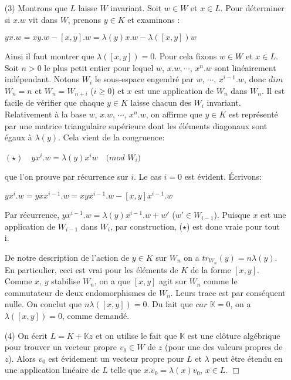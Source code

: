\documentclass[a4paper,openany,12pt]{report}
\newcommand{\KK}{\mathbb{K}}
\theoremstyle{break}
{\theorembodyfont{\upshape}
\newtheorem*{rmq}{Remarque :}
\newtheorem*{prv}{Preuve :}
\newtheorem*{ex}{Exemples :}
\newtheorem*{exe}{Exemple : }
\newtheorem*{nota}{Notation :}
\newtheorem*{dem}{D\'emonstration :}}
\begin{document}
\begin{dem}
\begin{itemize}
\item[(3)] Montrons que $L$ laisse $W$ invariant. Soit $w \in W$ et $x \in L$. Pour déterminer si $x.w$ vit dans $W$, prenons $y \in K$ et examinons :
\begin{center}
$yx.w=xy.w-[x,y].w= \lambda(y)x.w- \lambda([x,y])w $
\end{center}
Ainsi il faut montrer que $\lambda([x,y])=0$. Pour cela fixons $w \in W$ et $x \in L$. Soit $n>0$ le plus petit entier pour lequel $w$, $x.w, \cdots$, $x^{n}.w$ sont linéairement indépendant. Notons $W_{i}$ le sous-espace engendré par $w$, $\cdots$, $x^{i-1}.w$, donc $dim$ $W_{n}=n$ et $W_{n}=W_{n+i}$ ($i\geq 0$) et $x$ est une application de $W_{n}$ dans $W_{n}$. Il est facile de vérifier que chaque $y \in K$ laisse chacun des $W_{i}$ invariant. Relativement à la base $w$, $x.w$, $\cdots$, $x^{n}.w$, on affirme que $y \in K$ est représenté par une matrice triangulaire supérieure dont les éléments diagonaux sont égaux à $\lambda(y)$. Cela vient de la congruence:
\begin{center}
$(\star) \quad yx^{i}.w = \lambda(y)x^{i}w \quad (mod$ $W_{i})$
\end{center}
que l'on prouve par récurrence sur $i$. Le cas $i=0$ est évident. Écrivons: 
\begin{center}
$yx^{i}.w = yxx^{i-1}.w = xyx^{i-1}.w -[x,y]x^{i-1}.w $
\end{center}
Par récurrence, $yx^{i-1}.w = \lambda(y)x^{i-1}.w+w'$ ($w' \in W_{i-1}$). Puisque $x$ est une application de $W_{i-1}$ dans $W_{i}$, par construction, ($\star$) est donc vraie pour tout i.

De notre description de l'action de $y \in K$ sur $W_{n}$ on a $tr_{W_{n}}(y)=n \lambda(y)$. En particulier, ceci est vrai pour les éléments de $K$ de la forme $[x,y]$. Comme $x$, $y$ stabilise $W_{n}$, on a que $[x,y]$ agit sur $W_{n}$ comme le commutateur de deux endomorphismes de $W_{n}$. Leurs trace est par conséquent nulle. On conclut que $n \lambda([x,y]) = 0$. Du fait que $car$ $\KK=0$, on a $\lambda([x,y])=0$, comme demandé.

\item[(4)] On écrit $L=K+ \KK z$ et on utilise le fait que $\KK$ est une clôture algébrique pour trouver un vecteur propre $v_{0} \in W$ de $z$ (pour une des valeurs propres de $z$). Alors $v_{0}$ est évidement un vecteur propre pour $L$ et $\lambda$ peut être étendu en une application linéaire de $L$ telle que $x.v_{0} = \lambda(x)v_{0}$, $x \in L$. $\Box$
\end{itemize}
\end{dem}
\end{document}
